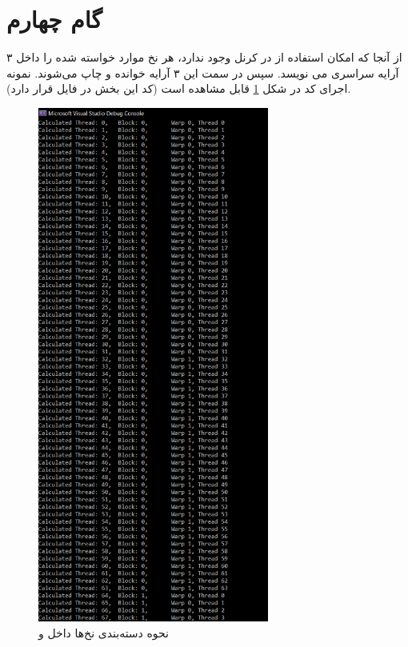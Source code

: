 \documentclass{HW}
\begin{document}
\section{گام چهارم}

از آنجا که امکان استفاده از  در کرنل وجود ندارد، هر نخ موارد خواسته شده را داخل ۳ آرایه سراسری می نویسد. سپس در سمت  این ۳ آرایه خوانده و چاپ می‌شوند. نمونه اجرای کد در شکل
\ref{fig:printf}
قابل مشاهده است (کد این بخش در فایل  قرار دارد).

\begin{figure}[ht!]
\begin{center}
	\includegraphics[height=17cm]{images/printf}
\end{center}
\caption{نحوه دسته‌بندی نخ‌ها داخل  و }
\label{fig:printf}
\end{figure}
\end{document}
